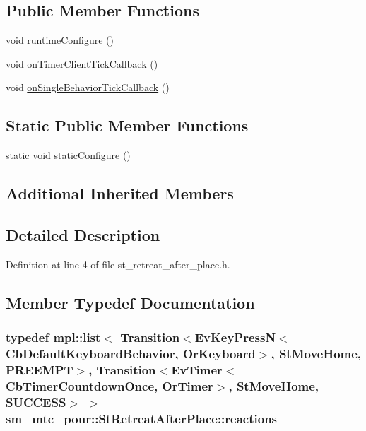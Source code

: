 \subsection*{Public Member Functions}
\begin{DoxyCompactItemize}
\item 
void \hyperlink{structsm__mtc__pour_1_1StRetreatAfterPlace_a0ee032196d2cdf38b34ab86915ec86c0}{runtime\+Configure} ()
\item 
void \hyperlink{structsm__mtc__pour_1_1StRetreatAfterPlace_a234541ef17a890826b2a5b03509ba222}{on\+Timer\+Client\+Tick\+Callback} ()
\item 
void \hyperlink{structsm__mtc__pour_1_1StRetreatAfterPlace_a1e6070afe8ca67ff8011db32e36ae3d9}{on\+Single\+Behavior\+Tick\+Callback} ()
\end{DoxyCompactItemize}
\subsection*{Static Public Member Functions}
\begin{DoxyCompactItemize}
\item 
static void \hyperlink{structsm__mtc__pour_1_1StRetreatAfterPlace_a397b646841e2ccb2d65907ba018715e4}{static\+Configure} ()
\end{DoxyCompactItemize}
\subsection*{Additional Inherited Members}


\subsection{Detailed Description}


Definition at line 4 of file st\+\_\+retreat\+\_\+after\+\_\+place.\+h.



\subsection{Member Typedef Documentation}
\subsubsection[{\texorpdfstring{reactions}{reactions}}]{\setlength{\rightskip}{0pt plus 5cm}typedef mpl\+::list$<$ Transition$<$Ev\+Key\+PressN$<$Cb\+Default\+Keyboard\+Behavior, {\bf Or\+Keyboard}$>$, {\bf St\+Move\+Home}, {\bf P\+R\+E\+E\+M\+PT}$>$, Transition$<$Ev\+Timer$<$Cb\+Timer\+Countdown\+Once, {\bf Or\+Timer}$>$, {\bf St\+Move\+Home}, {\bf S\+U\+C\+C\+E\+SS}$>$ $>$ {\bf sm\+\_\+mtc\+\_\+pour\+::\+St\+Retreat\+After\+Place\+::reactions}}\hypertarget{structsm__mtc__pour_1_1StRetreatAfterPlace_a7df36c3674129eacf543de4fe6fb650e}{}\label{structsm__mtc__pour_1_1StRetreatAfterPlace_a7df36c3674129eacf543de4fe6fb650e}


